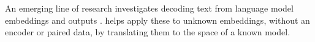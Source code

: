 



 An emerging line of research investigates decoding text from language model embeddings \citep{song2020informationleakageembeddingmodels, li2023sentenceembeddingleaksinformation, morris2023textembeddingsrevealalmost} and outputs \citep{morris2023languagemodelinversion, carlini2024stealingproductionlanguagemodel, zhang2024extractingpromptsinvertingllm}.  
\atk{} helps apply these to unknown embeddings, without an encoder or paired data, by translating them to the space of a known model. 



